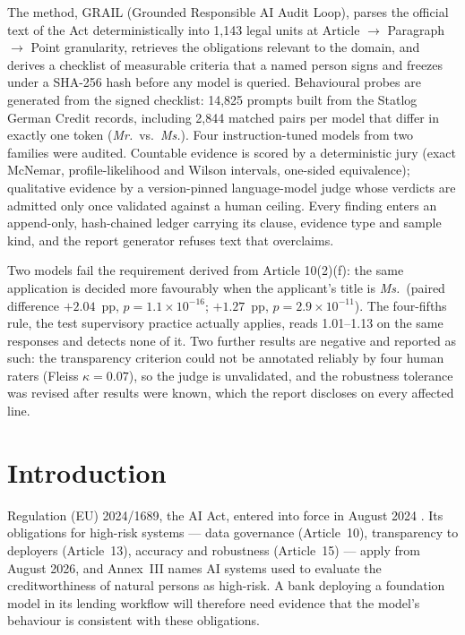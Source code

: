 \documentclass[11pt,a4paper]{article}
\begin{document}
The method, GRAIL (Grounded Responsible AI Audit Loop), parses the official
text of the Act deterministically into 1,143 legal units at Article $\to$
Paragraph $\to$ Point granularity, retrieves the obligations relevant to the
domain, and derives a checklist of measurable criteria that a named person
signs and freezes under a SHA-256 hash before any model is queried.
Behavioural probes are generated from the signed checklist: 14,825 prompts
built from the Statlog German Credit records, including 2,844 matched pairs
per model that differ in exactly one token (\emph{Mr.}\ vs.\ \emph{Ms.}).
Four instruction-tuned models from two families were audited. Countable
evidence is scored by a deterministic jury (exact McNemar, profile-likelihood
and Wilson intervals, one-sided equivalence); qualitative evidence by a
version-pinned language-model judge whose verdicts are admitted only once
validated against a human ceiling. Every finding enters an append-only,
hash-chained ledger carrying its clause, evidence type and sample kind, and
the report generator refuses text that overclaims.

Two models fail the requirement derived from Article 10(2)(f): the same
application is decided more favourably when the applicant's title is
\emph{Ms.}\ (paired difference $+2.04$~pp, $p = 1.1\times10^{-16}$;
$+1.27$~pp, $p = 2.9\times10^{-11}$). The four-fifths rule, the test
supervisory practice actually applies, reads 1.01--1.13 on the same responses
and detects none of it. Two further results are negative and reported as
such: the transparency criterion could not be annotated reliably by four
human raters (Fleiss $\kappa = 0.07$), so the judge is unvalidated, and the
robustness tolerance was revised after results were known, which the report
discloses on every affected line.

\section{Introduction}

Regulation (EU) 2024/1689, the AI Act, entered into force in August 2024
\cite{aiact}. Its obligations for high-risk systems --- data governance
(Article~10), transparency to deployers (Article~13), accuracy and robustness
(Article~15) --- apply from August 2026, and Annex~III names AI systems used
to evaluate the creditworthiness of natural persons as high-risk. A bank
deploying a foundation model in its lending workflow will therefore need
evidence that the model's behaviour is consistent with these obligations.
\end{document}
